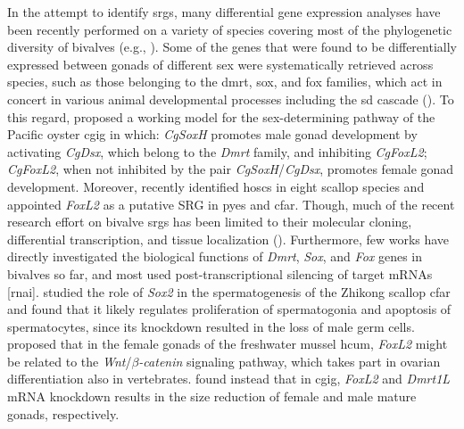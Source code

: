 \documentclass[../main.tex]{subfiles}
\begin{document}
In the attempt to identify \glspl{srg}, many differential gene expression analyses have been recently performed on a variety of species covering most of the phylogenetic diversity of bivalves (e.g., \textbf{\cite{milani2013nuclear,zhang2014genomic,chen2017transcriptome,capt2018deciphering,ghiselli2018comparative,shi2018proteome}}). Some of the genes that were found to be differentially expressed between gonads of different sex were systematically retrieved across species, such as those belonging to the \gls{dmrt}, \gls{sox}, and \gls{fox} families, which act in concert in various animal developmental processes including the \gls{sd} cascade (\textbf{\cite{marshall2010homologies,beukeboom2014evolution}}). To this regard, \textbf{\cite{zhang2014genomic}} proposed a working model for the sex-determining pathway of the Pacific oyster \gls{cgig} in which: \textit{CgSoxH} promotes male gonad development by activating \textit{CgDsx}, which belong to the \textit{Dmrt} family, and inhibiting \textit{CgFoxL2}; \textit{CgFoxL2}, when not inhibited by the pair \textit{CgSoxH}/\textit{CgDsx}, promotes female gonad development. Moreover, \textbf{\cite{han2022ancient}} recently identified \glspl{hosc} in eight scallop species and appointed \textit{FoxL2} as a putative SRG in \gls{pyes} and \gls{cfar}. Though, much of the recent research effort on bivalve \glspl{srg} has been limited to their molecular cloning, differential transcription, and tissue localization (\textbf{\cite{liang2019sox2,sun2022examination}}). Furthermore, few works have directly investigated the biological functions of \textit{Dmrt}, \textit{Sox}, and \textit{Fox} genes in bivalves so far, and most used post-transcriptional silencing of target mRNAs [\gls{rnai}]. \textbf{\cite{liang2019sox2}} studied the role of \textit{Sox2} in the spermatogenesis of the Zhikong scallop \gls{cfar} and found that it likely regulates proliferation of spermatogonia and apoptosis of spermatocytes, since its knockdown resulted in the loss of male germ cells. \textbf{\cite{wang2020identification}} proposed that in the female gonads of the freshwater mussel \gls{hcum}, \textit{FoxL2} might be related to the \textit{Wnt}/\textit{$\beta$-catenin} signaling pathway, which takes part in ovarian differentiation also in vertebrates. \textbf{\cite{sun2022examination}} found instead that in \gls{cgig}, \textit{FoxL2} and \textit{Dmrt1L} mRNA knockdown results  in the size reduction of female and male mature gonads, respectively.
\end{document}
